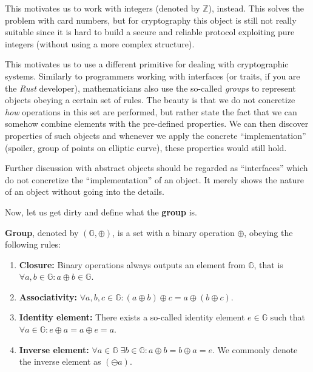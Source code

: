 \documentclass[../lecture-notes.tex]{subfiles}
\begin{document}
This motivates us to work with integers (denoted by $\mathbb{Z}$), instead. This solves the problem with card numbers, but for cryptography this object is still not really suitable since it is hard to build a secure and reliable protocol exploiting pure integers (without using a more complex structure). 

This motivates us to use a different primitive for dealing with cryptographic systems. Similarly to programmers working with interfaces (or traits, if you are the \textit{Rust} developer), mathematicians also use the so-called \textit{groups} to represent objects obeying a certain set of rules. The beauty is that we do not concretize \textit{how} operations in this set are performed, but rather state the fact that we can somehow combine elements with the pre-defined properties. We can then discover properties of such objects and whenever we apply the concrete ``implementation'' (spoiler, group of points on elliptic curve), these properties would still hold.

\begin{remark}
    Further discussion with abstract objects should be regarded as ``interfaces'' which do not concretize the ``implementation'' of an object. It merely shows the nature of an object without going into the details.
\end{remark}

Now, let us get dirty and define what the \textbf{group} is.

\begin{definition}
    \textbf{Group}, denoted by $(\mathbb{G}, \oplus)$, is a set with a binary operation $\oplus$, obeying the following rules:
    \begin{enumerate}
        \item \textbf{Closure:} Binary operations always outputs an element from $\mathbb{G}$, that is $\forall a,b \in \mathbb{G}: a \oplus b \in \mathbb{G}$.
        \item \textbf{Associativity:} $\forall a,b,c \in \mathbb{G}: (a \oplus b)\oplus c = a \oplus (b \oplus c)$.
        \item \textbf{Identity element:} There exists a so-called identity element $e \in \mathbb{G}$ such that $\forall a \in \mathbb{G}: e \oplus a = a \oplus e = a$.
        \item \textbf{Inverse element:} $\forall a \in \mathbb{G} \; \exists b \in \mathbb{G}: a\oplus b = b \oplus a = e$. We commonly denote the inverse element as $(\ominus a)$.
    \end{enumerate}
\end{definition}
\end{document}
